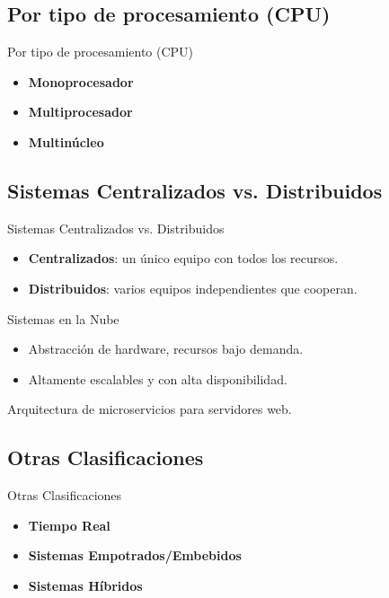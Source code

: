 \documentclass{beamer}
\begin{document}
\subsection{Por tipo de procesamiento (CPU)}
\begin{frame}{Por tipo de procesamiento (CPU)}
    \begin{itemize}
        \item \textbf{Monoprocesador}
        \item \textbf{Multiprocesador}
        \item \textbf{Multinúcleo}
    \end{itemize}
\end{frame}

\subsection{Sistemas Centralizados vs. Distribuidos}
\begin{frame}{Sistemas Centralizados vs. Distribuidos}
    \begin{itemize}
        \item \textbf{Centralizados}: un único equipo con todos los recursos.
        \item \textbf{Distribuidos}: varios equipos independientes que cooperan.
    \end{itemize}
\end{frame}

\begin{frame}{Sistemas en la Nube}
    \begin{itemize}
        \item Abstracción de hardware, recursos bajo demanda.
        \item Altamente escalables y con alta disponibilidad.
    \end{itemize}
    \vfill
    \centering
    Arquitectura de microservicios para servidores web.
\end{frame}

\subsection{Otras Clasificaciones}
\begin{frame}{Otras Clasificaciones}
    \begin{itemize}
        \item \textbf{Tiempo Real}
        \item \textbf{Sistemas Empotrados/Embebidos}
        \item \textbf{Sistemas Híbridos}
    \end{itemize}
\end{frame}
\end{document}
